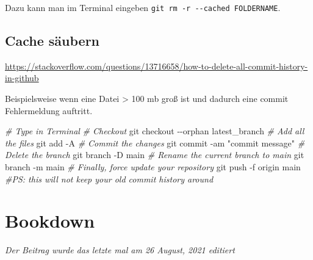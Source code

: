 \documentclass[
]{article}
\newenvironment{Shaded}{\begin{snugshade}}{\end{snugshade}}
\newcommand{\CommentTok}[1]{\textcolor[rgb]{0.56,0.35,0.01}{\textit{#1}}}
\newcommand{\NormalTok}[1]{#1}
\newcommand{\SpecialCharTok}[1]{\textcolor[rgb]{0.00,0.00,0.00}{#1}}
\newcommand{\StringTok}[1]{\textcolor[rgb]{0.31,0.60,0.02}{#1}}
\begin{document}
Dazu kann man im Terminal eingeben \texttt{git\ rm\ -r\ -\/-cached\ FOLDERNAME}.

\hypertarget{cache-suxe4ubern}{%
\subsection{Cache säubern}\label{cache-suxe4ubern}}

\url{https://stackoverflow.com/questions/13716658/how-to-delete-all-commit-history-in-github}

Beispielsweise wenn eine Datei \textgreater{} 100 mb groß ist und dadurch eine commit Fehlermeldung auftritt.

\begin{Shaded}
\begin{Highlighting}[]
\CommentTok{\# Type in Terminal}
\CommentTok{\# Checkout}
\NormalTok{git checkout }\SpecialCharTok{{-}{-}}\NormalTok{orphan latest\_branch}
\CommentTok{\# Add all the files}
\NormalTok{git add }\SpecialCharTok{{-}}\NormalTok{A }
\CommentTok{\# Commit the changes}
\NormalTok{git commit }\SpecialCharTok{{-}}\NormalTok{am }\StringTok{"commit message"}
\CommentTok{\# Delete the branch}
\NormalTok{git branch }\SpecialCharTok{{-}}\NormalTok{D main}
\CommentTok{\# Rename the current branch to main}
\NormalTok{git branch }\SpecialCharTok{{-}}\NormalTok{m main}
\CommentTok{\# Finally, force update your repository}
\NormalTok{git push }\SpecialCharTok{{-}}\NormalTok{f origin main}
\CommentTok{\#PS: this will not keep your old commit history around}
\end{Highlighting}
\end{Shaded}

\hypertarget{bookdown}{%
\section{Bookdown}\label{bookdown}}

\emph{Der Beitrag wurde das letzte mal am 26 August, 2021 editiert}
\end{document}
